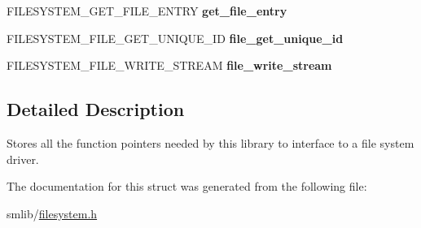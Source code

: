 \begin{DoxyCompactItemize}
\item 
\hypertarget{struct_f_i_l_e_s_y_s_t_e_m_a64ab3be2e3dc11fe1209690fe6f3cdcb}{F\-I\-L\-E\-S\-Y\-S\-T\-E\-M\-\_\-\-G\-E\-T\-\_\-\-F\-I\-L\-E\-\_\-\-E\-N\-T\-R\-Y {\bfseries get\-\_\-file\-\_\-entry}}\label{struct_f_i_l_e_s_y_s_t_e_m_a64ab3be2e3dc11fe1209690fe6f3cdcb}

\item 
\hypertarget{struct_f_i_l_e_s_y_s_t_e_m_add122a401d5391d139bd968a01b2d5ae}{F\-I\-L\-E\-S\-Y\-S\-T\-E\-M\-\_\-\-F\-I\-L\-E\-\_\-\-G\-E\-T\-\_\-\-U\-N\-I\-Q\-U\-E\-\_\-\-I\-D {\bfseries file\-\_\-get\-\_\-unique\-\_\-id}}\label{struct_f_i_l_e_s_y_s_t_e_m_add122a401d5391d139bd968a01b2d5ae}

\item 
\hypertarget{struct_f_i_l_e_s_y_s_t_e_m_a92c09d10bd2013c7b4fc00447ef0401f}{F\-I\-L\-E\-S\-Y\-S\-T\-E\-M\-\_\-\-F\-I\-L\-E\-\_\-\-W\-R\-I\-T\-E\-\_\-\-S\-T\-R\-E\-A\-M {\bfseries file\-\_\-write\-\_\-stream}}\label{struct_f_i_l_e_s_y_s_t_e_m_a92c09d10bd2013c7b4fc00447ef0401f}

\end{DoxyCompactItemize}


\subsection{Detailed Description}
Stores all the function pointers needed by this library to interface to a file system driver. 

The documentation for this struct was generated from the following file\-:\begin{DoxyCompactItemize}
\item 
smlib/\hyperlink{filesystem_8h}{filesystem.\-h}\end{DoxyCompactItemize}

